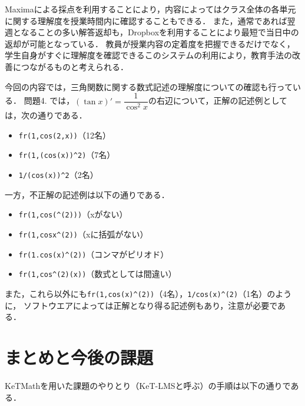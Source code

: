 \documentclass[a4j,12pt]{ujarticle}
\begin{document}
Maximaによる採点を利用することにより，内容によってはクラス全体の各単元に関する理解度を授業時間内に確認することもできる．
また，通常であれば翌週となることの多い解答返却も，Dropboxを利用することにより最短で当日中の返却が可能となっている．
教員が授業内容の定着度を把握できるだけでなく，学生自身がすぐに理解度を確認できるこのシステムの利用により，教育手法の改善につながるものと考えられる．

今回の内容では，三角関数に関する数式記述の理解度についての確認も行っている．
問題4. では，$(\tan x)'=\dfrac{1}{\cos^2{x}}$の右辺について，正解の記述例としては，次の通りである．\vspace{-2mm}

\begin{itemize}
\item \verb|fr(1,cos(2,x))|（12名）\vspace{-2mm}
\item \verb|fr(1,(cos(x))^2)|（7名）\vspace{-2mm}
\item \verb|1/(cos(x))^2|（2名）\vspace{-2mm}
\end{itemize}
一方，不正解の記述例は以下の通りである．\vspace{-2mm}
\begin{itemize}
\item \verb|fr(1,cos(^(2)))|（xがない）\vspace{-2mm}
\item \verb|fr(1,cosx^(2))|（xに括弧がない）\vspace{-2mm}
\item \verb|fr(1.cos(x)^(2))|（コンマがピリオド）\vspace{-2mm}
\item \verb|fr(1,cos^(2)(x))|（数式としては間違い）
\end{itemize}

また，これら以外にも\verb|fr(1,cos(x)^(2))|（4名），\verb|1/cos(x)^(2)|（1名）のように，
ソフトウエアによっては正解となり得る記述例もあり，注意が必要である．

\section{まとめと今後の課題}

KeTMathを用いた課題のやりとり（KeT-LMSと呼ぶ）の手順は以下の通りである．
\vspace{-2mm}
\end{document}
